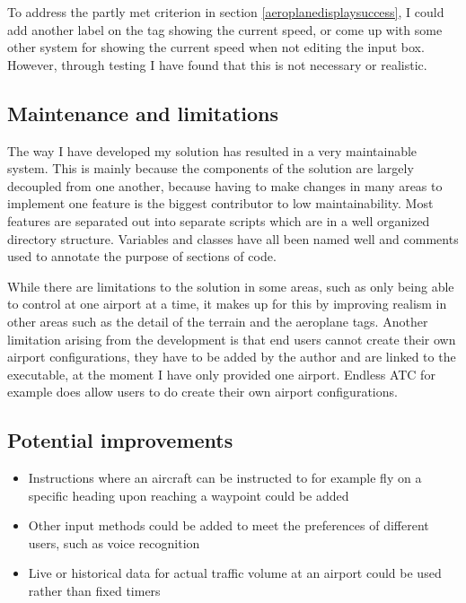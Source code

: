 \documentclass{article}
\begin{document}
To address the partly met criterion in section \ref{aeroplanedisplaysuccess}, I could add another label on the tag showing the current speed, or come up with some other system for showing the current speed when not editing the input box.
However, through testing I have found that this is not necessary or realistic.


\subsection{Maintenance and limitations}
The way I have developed my solution has resulted in a very maintainable system.
This is mainly because the components of the solution are largely decoupled from one another, because having to make changes in many areas to implement one feature is the biggest contributor to low maintainability.
Most features are separated out into separate scripts which are in a well organized directory structure.
Variables and classes have all been named well and comments used to annotate the purpose of sections of code.

While there are limitations to the solution in some areas, such as only being able to control at one airport at a time, it makes up for this by improving realism in other areas such as the detail of the terrain and the aeroplane tags.
Another limitation arising from the development is that end users cannot create their own airport configurations, they have to be added by the author and are linked to the executable, at the moment I have only provided one airport.
Endless ATC for example does allow users to do create their own airport configurations.

\subsection{Potential improvements}
\begin{itemize}
    \item Instructions where an aircraft can be instructed to for example fly on a specific heading upon reaching a waypoint could be added
    \item Other input methods could be added to meet the preferences of different users, such as voice recognition
    \item Live or historical data for actual traffic volume at an airport could be used rather than fixed timers
\end{itemize}

\clearpage

\printbibliography
{}
\end{document}
